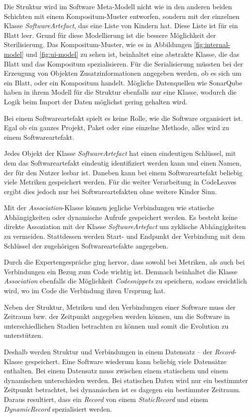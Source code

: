 Die Struktur wird im Software Meta-Modell nicht wie in den anderen beiden Schichten mit einem Kompositum-Muster entworfen, sondern mit der einzelnen Klasse \textit{SoftwareArtefact}, das eine Liste von Kindern hat. Diese Liste ist für ein Blatt leer. Grund für diese Modellierung ist die bessere Möglichkeit der Sterilisierung. Das Kompositum-Muster, wie es in Abbildungen \ref{fig:internal-model} und \ref{fig:ui-model} zu sehen ist, beinhaltet eine abstrakte Klasse, die das Blatt und das Kompositum spezialisieren. Für die Serialisierung müssten bei der Erzeugung von Objekten Zusatzinformationen angegeben werden, ob es sich um ein Blatt, oder ein Kompositum handelt. Mögliche Datenquellen wie SonarQube haben in ihrem Modell für die Struktur ebenfalls nur eine Klasse, wodurch die Logik beim Import der Daten möglichst gering gehalten wird.

Bei einem Softwareartefakt spielt es keine Rolle, wie die Software organisiert ist. Egal ob ein ganzes Projekt, Paket oder eine einzelne Methode, alles wird zu einem Softwareartefakt.

Jedes Objekt der Klasse \textit{SoftwareArtefact} hat einen eindeutigen Schlüssel, mit dem das Softwareartefakt eindeutig identifiziert werden kann und einen Namen, der für den Nutzer lesbar ist. Daneben kann bei einem Softwareartefakt beliebig viele Metriken gespeichert werden. Für die weiter Verarbeitung in CodeLeaves ergibt dies jedoch nur bei Softwareartefakten ohne weitere Kinder Sinn.

Mit der \textit{Association}-Klasse können jegliche Verbindungen wie statische Abhängigkeiten oder dynamische Aufrufe gespeichert werden. Es besteht keine direkte Assoziation mit der Klasse \textit{SoftwareArtefact} um zyklische Abhängigkeiten zu vermeiden. Stattdessen werden Start- und Endpunkt der Verbindung mit dem Schlüssel der zugehörigen Softwareartefakte angegeben.

Durch die Expertengespräche ging hervor, dass sowohl bei Metriken, als auch bei Verbindungen ein Bezug zum Code wichtig ist. Demnach beinhaltet die Klasse \textit{Association} ebenfalls die Möglichkeit \textit{Codesnippets} zu speichern, sodass ersichtlich wird, wo im Code die Verbindung ihren Ursprung hat.

Neben der Struktur, Metriken und den Verbindungen einer Software muss der Zeitraum bzw. der Zeitpunkt angegeben werden können, um die Software in unterschiedlichen Stadien betrachten zu können und somit die Evolution zu unterstützen.

Deshalb werden Struktur und Verbindungen in einem Datensatz -- der \textit{Record}-Klasse gespeichert. Eine Software wiederum kann beliebig viele Datensätze enthalten. Bei einem Datensatz muss zwischen einem statischem und einem dynamischen unterschieden werden. Bei statischen Daten wird nur ein bestimmter Zeitpunkt betrachtet, bei dynamischen ist es dagegen ein bestimmter Zeitraum. Daraus resultiert, dass ein \textit{Record} von einem \textit{StaticRecord} und einem \textit{DynamicRecord} spezialisiert werden.

